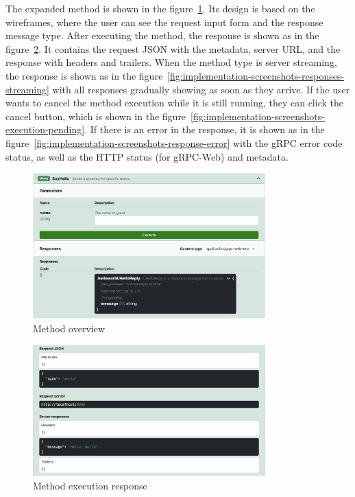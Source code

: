 The expanded method is shown in the figure~\ref{fig:implementation-screenshots-method}.
Its design is based on the wireframes, where the user can see the request input form and the response message type.
After executing the method, the response is shown as in the figure~\ref{fig:implementation-screenshots-response}.
It contains the request JSON with the metadata, server URL, and the response with headers and trailers.
When the method type is server streaming, the response is shown as in the figure~\ref{fig:implementation-screenshots-responses-streaming} with all responses gradually showing as soon as they arrive.
If the user wants to cancel the method execution while it is still running, they can click the cancel button, which is shown in the figure~\ref{fig:implementation-screenshots-execution-pending}.
If there is an error in the response, it is shown as in the figure~\ref{fig:implementation-screenshots-response-error} with the gRPC error code status, as well as the HTTP status (for gRPC-Web) and metadata.


\begin{figure}[!htb]
    \centering
    \captionsetup{justification=centering}
    \includegraphics[width=0.8\textwidth]{images/implementation/screenshots/method}
    \caption{Method overview}
    \label{fig:implementation-screenshots-method}
\end{figure}

\begin{figure}[!htb]
    \centering
    \captionsetup{justification=centering}
    \includegraphics[width=0.8\textwidth]{images/implementation/screenshots/response}
    \caption{Method execution response}
    \label{fig:implementation-screenshots-response}
\end{figure}


